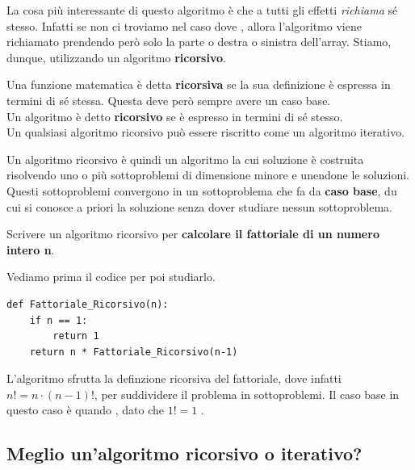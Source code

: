 \documentclass[11pt, a4paper, titlepage, oneside]{scrbook}
\begin{document}
La cosa più interessante di questo algoritmo è che a tutti gli effetti \textit{richiama} sé stesso. Infatti se non ci troviamo nel caso dove , allora l'algoritmo viene richiamato prendendo però solo la parte o destra o sinistra dell'array. Stiamo, dunque, utilizzando un algoritmo \textbf{ricorsivo}.

\begin{Definizione}
\label{def-funzioni-algoritmi-ricorsivi}
Una funzione matematica è detta \textbf{ricorsiva} se la sua definizione è espressa in termini di sé stessa. Questa deve però sempre avere un caso base. \\
Un algoritmo è detto \textbf{ricorsivo} se è espresso in termini di sé stesso.\\
\NB Un qualsiasi algoritmo ricorsivo può essere riscritto come un algoritmo iterativo.
\end{Definizione}

Un algoritmo ricorsivo è quindi un algoritmo la cui soluzione è costruita risolvendo uno o più sottoproblemi di dimensione minore e unendone le soluzioni. Questi sottoproblemi convergono in un sottoproblema che fa da \textbf{caso base}, du cui si conosce a priori la soluzione senza dover studiare nessun sottoproblema.

\Esempio \nopagebreak

Scrivere un algoritmo ricorsivo per \textbf{calcolare il fattoriale di un numero intero n}. \nopagebreak

Vediamo prima il codice per poi studiarlo.

\begin{lstlisting}[style=Python]
def Fattoriale_Ricorsivo(n):
    if n == 1:
        return 1
    return n * Fattoriale_Ricorsivo(n-1)
\end{lstlisting}

L'algoritmo sfrutta la definzione ricorsiva del fattoriale, dove infatti $n! = n \cdot (n-1)!$, per suddividere il problema in sottoproblemi. Il caso base in questo caso è quando , dato che $1! = 1$ .

\subsection{Meglio un'algoritmo ricorsivo o iterativo?}
\end{document}
